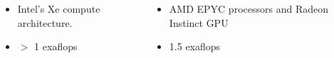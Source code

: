 \begin{frame}
\begin{columns}[T]
\begin{column}{0.49\textwidth}
    \begin{itemize}
      \item Intel’s Xe compute architecture.
      \item $>$ 1 exaflops
    \end{itemize}
    \end{column}
    \begin{column}{0.49\textwidth}
      \begin{itemize}
        \item AMD EPYC processors and Radeon Instinct GPU
        \item 1.5 exaflops
      \end{itemize}
    \end{column}
  \end{columns}
\end{frame}

